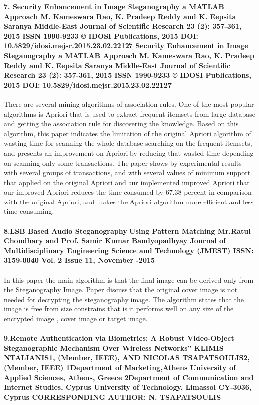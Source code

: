 \documentclass[12pt]{extreport}
\begin{document}
\noindent
\textbf{7. Security Enhancement in Image Steganography a MATLAB Approach
M. Kameswara Rao, K. Pradeep Reddy and K. Eepsita Saranya
Middle-East Journal of Scientific Research 23 (2): 357-361, 2015
ISSN 1990-9233
© IDOSI Publications, 2015
DOI: 10.5829/idosi.mejsr.2015.23.02.22127 Security Enhancement in Image Steganography a MATLAB Approach
M. Kameswara Rao, K. Pradeep Reddy and K. Eepsita Saranya
Middle-East Journal of Scientific Research 23 (2): 357-361, 2015
ISSN 1990-9233
© IDOSI Publications, 2015
DOI: 10.5829/idosi.mejsr.2015.23.02.22127}\\\\
There are several mining algorithms of association rules. One of the most popular algorithms is Apriori that is used to extract frequent itemsets from large database and getting the association rule for discovering the knowledge. Based on this algorithm, this paper indicates the limitation of the original Apriori algorithm of wasting time for scanning the whole database searching on the frequent itemsets, and presents an improvement on Apriori by reducing that wasted time depending on scanning only some transactions. The paper shows by experimental results with several groups of transactions, and with several values of minimum support that applied on the original Apriori and our implemented improved Apriori that our improved Apriori reduces the time consumed by 67.38 percent in comparison with the original Apriori, and makes the Apriori algorithm more efficient and less time consuming.\\\\
\textbf{8.LSB Based Audio Steganography Using Pattern Matching
Mr.Ratul Choudhary and Prof. Samir Kumar Bandyopadhyay
Journal of Multidisciplinary Engineering Science and Technology (JMEST)
ISSN: 3159-0040
Vol. 2 Issue 11, November -2015}\\\\
In this paper the main algorithm is that the final image can be derived only from the Steganography Image. Paper discuss that the original cover image is not needed for decrypting the steganography image. The algorithm states that the image is free from size constrains that is  it performs well on any size of the encrypted image , cover image or target image.\\\\
  \textbf{9.Remote Authentication via Biometrics: A Robust Video-Object Steganographic Mechanism Over Wireless Networks” KLIMIS NTALIANIS1, (Member, IEEE), AND NICOLAS TSAPATSOULIS2, (Member, IEEE) 1Department of Marketing,Athens University of Applied Sciences, Athens, Greece 2Department of Communication and Internet Studies, Cyprus University of Technology, Limassol CY-3036, Cyprus CORRESPONDING AUTHOR: N. TSAPATSOULIS }\\\\
\end{document}
